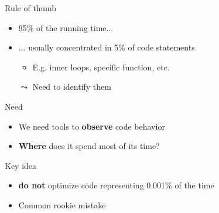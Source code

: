 \documentclass[xcolor={x11names,svgnames}]{beamer}
\begin{document}
\begin{frame}
  \begin{block}{Rule of thumb}
    \begin{itemize}
    \item 95\% of the running time...
    \item ... usually concentrated in 5\% of code statements
      \begin{itemize}
      \item E.g. inner loops, specific function, etc.
      \end{itemize}
    \item[$\leadsto$] Need to identify them
    \end{itemize}
  \end{block}
  
  \begin{alertblock}{Need}
    \begin{itemize}
    \item We need tools to \textbf{observe} code behavior
    \item \textbf{Where} does it spend most of its time?      
    \end{itemize}
  \end{alertblock}

  \begin{exampleblock}{Key idea}
    \begin{itemize}
    \item \textbf{do not} optimize code representing 0.001\% of the time
    \item Common rookie mistake
    \end{itemize}
  \end{exampleblock}

\end{frame}

\end{document}
